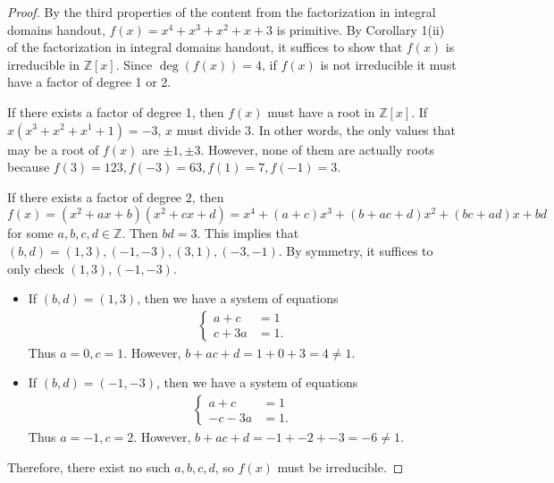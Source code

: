 \documentclass[12pt, psamsfonts]{amsart}
\theoremstyle{definition}
\theoremstyle{remark}
\numberwithin{equation}{section}
\begin{document}
\begin{proof}
  By the third properties of the content from the factorization in integral domains handout, $f(x) = x^4 + x^3 + x^2 + x + 3$ is primitive.
  By Corollary 1(ii) of the factorization in integral domains handout, it suffices to show that $f(x)$ is irreducible in $\mathbb{Z}[x]$.
  Since $\deg(f(x)) = 4$, if $f(x)$ is not irreducible it must have a factor of degree 1 or 2.

  If there exists a factor of degree 1, then $f(x)$ must have a root in $\mathbb{Z}[x]$.
  If $x(x^3 + x^2 + x^1 + 1) = -3$, $x$ must divide 3.
  In other words, the only values that may be a root of $f(x)$ are $\pm 1, \pm 3$.
  However, none of them are actually roots because $f(3) = 123, f(-3) = 63, f(1) = 7, f(-1) = 3$.

  If there exists a factor of degree 2, then $f(x) = (x^2 + ax + b)(x^2 + cx + d) = x^4 + (a + c)x^3 + (b + ac + d)x^2 + (bc + ad)x + bd$ for some $a, b, c, d \in \mathbb{Z}$.
  Then $bd = 3$.
  This implies that $(b, d) = (1, 3), (-1, -3), (3, 1), (-3, -1)$.
  By symmetry, it suffices to only check $(1, 3), (-1, -3)$.
  \begin{itemize}
    \item
      If $(b, d) = (1, 3)$, then we have a system of equations
      \begin{align*}
        \begin{cases}
          a + c &= 1 \\
          c + 3a &= 1.
        \end{cases}
      \end{align*}
      Thus $a = 0, c = 1$.
      However, $b + ac + d = 1 + 0 + 3 = 4 \ne 1$.
    \item
      If $(b, d) = (-1, -3)$, then we have a system of equations
      \begin{align*}
        \begin{cases}
          a + c &= 1 \\
          -c - 3a &= 1.
        \end{cases}
      \end{align*}
      Thus $a = -1, c = 2$.
      However, $b + ac + d = -1 + -2 + -3 = -6 \ne 1$.
  \end{itemize}
  Therefore, there exist no such $a, b, c, d$, so $f(x)$ must be irreducible.
\end{proof}
\end{document}
